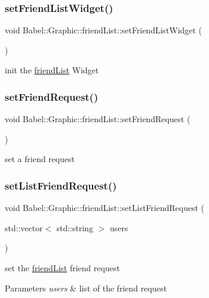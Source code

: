 \subsubsection{\texorpdfstring{set\+Friend\+List\+Widget()}{setFriendListWidget()}}
{\footnotesize\ttfamily void Babel\+::\+Graphic\+::friend\+List\+::set\+Friend\+List\+Widget (\begin{DoxyParamCaption}{ }\end{DoxyParamCaption})}

init the \hyperlink{classBabel_1_1Graphic_1_1friendList}{friend\+List} Widget \mbox{\label{classBabel_1_1Graphic_1_1friendList_ae85d2ce8319de8b068b4b2667a94475d}} 
\subsubsection{\texorpdfstring{set\+Friend\+Request()}{setFriendRequest()}}
{\footnotesize\ttfamily void Babel\+::\+Graphic\+::friend\+List\+::set\+Friend\+Request (\begin{DoxyParamCaption}{ }\end{DoxyParamCaption})}

set a friend request \mbox{\label{classBabel_1_1Graphic_1_1friendList_a68a9cd0acdd89379427ef24d6407110b}} 
\subsubsection{\texorpdfstring{set\+List\+Friend\+Request()}{setListFriendRequest()}}
{\footnotesize\ttfamily void Babel\+::\+Graphic\+::friend\+List\+::set\+List\+Friend\+Request (\begin{DoxyParamCaption}\item[{std\+::vector$<$ std\+::string $>$}]{users }\end{DoxyParamCaption})}

set the \hyperlink{classBabel_1_1Graphic_1_1friendList}{friend\+List} friend request 
\begin{DoxyParams}{Parameters}
{\em users} & list of the friend request \\
\hline
\end{DoxyParams}
\mbox{\label{classBabel_1_1Graphic_1_1friendList_a6b8da71bb970ffe7d342bcc811582d5d}} 
